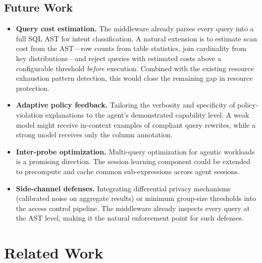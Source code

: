 \documentclass[sigconf, nonacm]{acmart}
\begin{document}
\subsection{Future Work}

\begin{itemize}[leftmargin=*]
  \item \textbf{Query cost estimation.}
        The middleware already parses every query into a full SQL AST for
        intent classification.  A natural extension is to estimate scan
        cost from the AST---row counts from table statistics, join
        cardinality from key distributions---and reject queries with
        estimated costs above a configurable threshold \emph{before}
        execution.  Combined with the existing resource exhaustion
        pattern detection, this would close the remaining gap in
        resource protection.

  \item \textbf{Adaptive policy feedback.}
        Tailoring the verbosity and specificity of policy-violation
        explanations to the agent's demonstrated capability level.
        A weak model might receive in-context examples of compliant
        query rewrites, while a strong model receives only the column
        annotation.

  \item \textbf{Inter-probe optimization.}
        Multi-query optimization for agentic
        workloads~\cite{liu2025sao,sellis1988mpo} is a promising direction.
        The session learning
        component could be extended to precompute and cache common
        sub-expressions across agent sessions.

  \item \textbf{Side-channel defenses.}
        Integrating differential privacy mechanisms (calibrated noise on
        aggregate results) or minimum group-size thresholds into the
        access control pipeline.  The middleware already inspects every
        query at the AST level, making it the natural enforcement point
        for such defenses.
\end{itemize}


\section{Related Work}
\label{sec:related}
\end{document}
